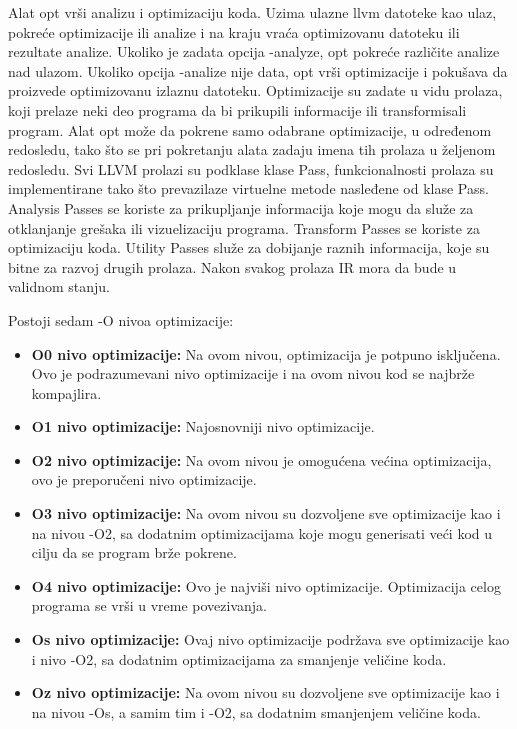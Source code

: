 \documentclass[a4paper]{article}
\begin{document}
Alat opt vrši analizu i optimizaciju koda. Uzima ulazne llvm datoteke kao ulaz, pokreće optimizacije ili analize i na kraju vraća optimizovanu datoteku ili rezultate analize. Ukoliko je zadata opcija -analyze, opt pokreće različite analize nad ulazom. Ukoliko opcija  -analize nije data, opt vrši optimizacije i pokušava da proizvede optimizovanu izlaznu datoteku. Optimizacije su zadate u vidu prolaza, koji prelaze neki deo programa da bi prikupili informacije ili transformisali program. Alat opt može da pokrene samo odabrane optimizacije, u određenom redosledu, tako što se pri pokretanju alata zadaju imena tih prolaza u željenom redosledu. Svi LLVM prolazi su podklase klase Pass, funkcionalnosti prolaza su implementirane tako što prevazilaze virtuelne metode nasleđene od klase Pass. Analysis Passes se koriste za prikupljanje informacija koje mogu da služe za otklanjanje grešaka ili vizuelizaciju programa. Transform Passes se koriste za optimizaciju koda. Utility Passes služe za dobijanje raznih informacija, koje su bitne za razvoj drugih prolaza. Nakon svakog prolaza IR mora da bude u validnom stanju.

Postoji sedam -O nivoa optimizacije: 
\begin{itemize}
\item \textbf{O0 nivo optimizacije:} Na ovom nivou, optimizacija je potpuno isključena. Ovo je podrazumevani nivo optimizacije i na ovom nivou kod se najbrže kompajlira.
\item \textbf{O1 nivo optimizacije:} Najosnovniji nivo optimizacije.
\item \textbf{O2 nivo optimizacije:} Na ovom nivou je omogućena većina optimizacija, ovo je preporučeni nivo optimizacije.
\item \textbf{O3 nivo optimizacije:} Na ovom nivou su dozvoljene sve optimizacije kao i na nivou -O2, sa dodatnim optimizacijama koje mogu generisati veći kod u cilju da se program brže pokrene.
\item \textbf{O4 nivo optimizacije:} Ovo je najviši nivo optimizacije. Optimizacija celog programa se vrši u vreme povezivanja. 
\item \textbf{Os nivo optimizacije:} Ovaj nivo optimizacije podržava sve optimizacije kao i nivo -O2, sa dodatnim optimizacijama za smanjenje veličine koda.
\item \textbf{Oz nivo optimizacije:} Na ovom nivou su dozvoljene sve optimizacije kao i na nivou -Os, a samim tim i -O2,  sa dodatnim smanjenjem veličine koda. \cite{opt} \cite{pass} \cite{pass2}
\end{itemize}
\end{document}
